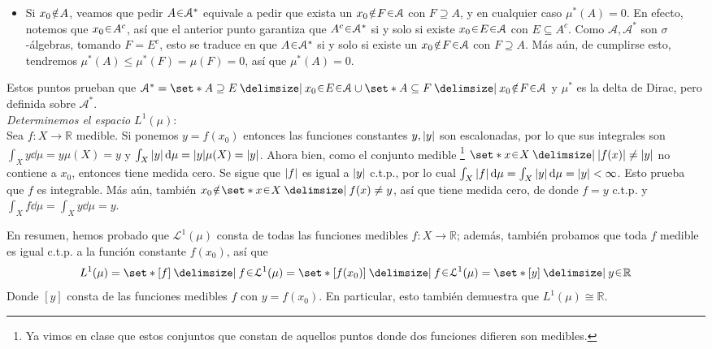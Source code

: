 \begin{sol}
\begin{itemize}
\item Si $x_0 \noten A$, veamos que pedir $A\en\mathcal{A}^*$ equivale a pedir que exista un $x_0 \noten F \en\mathcal{A}$ con $F \supseteq A$, y en cualquier caso $\mu^*(A) = 0$. 
En efecto, notemos que $x_0\en A^c$, así que el anterior punto garantiza que $A^c\en\mathcal{A}^*$ si y solo si existe $x_0 \en E \en\mathcal{A}$ con $E \subseteq A^c$. Como $\mathcal{A},\mathcal{A}^*$ son $\sigma$-álgebras, tomando $F = E^c$, esto se traduce en que $A\en\mathcal{A}^*$ si y solo si existe un $x_0 \noten F \en\mathcal{A}$ con $F \supseteq A$. Más aún, de cumplirse esto, tendremos $\mu^*(A) \leq \mu^*(F) = \mu(F) = 0$, así que $\mu^*(A) = 0$.
\end{itemize}
Estos puntos prueban que $\mathcal{A}^* = \set*{A \supseteq E \given x_0 \en E \en\mathcal{A}} \cup \set*{A \subseteq F \given x_0 \noten F \en\mathcal{A}}$ y $\mu^*$ es la delta de Dirac, pero definida sobre $\mathcal{A}^*$.\vspace{1em}\\
\emph{Determinemos el espacio $L^1(\mu)$}:\\
Sea $f \colon X \to\mathbb{R}$ medible. Si ponemos $y=f(x_0)$ entonces las funciones constantes $y,\abs{y}$ son escalonadas, por lo que sus integrales son $\int_X y \dd{\mu} = y\mu(X) = y$ y $\int_X\abs{y}\dd{\mu} = \abs{y}\mu(X) = \abs{y}$. Ahora bien, como el conjunto medible%
\footnote{
    Ya vimos en clase que estos conjuntos que constan de aquellos puntos donde dos funciones difieren son medibles.
} 
$\set*{x\en X \given \abs{f(x)} \neq \abs{y}}$ no contiene a $x_0$, entonces tiene medida cero. Se sigue que $\abs{f}$ es igual a $\abs{y}$ c.t.p., por lo cual $\int_X \abs{f} \dd{\mu} = \int_X \abs{y} \dd{\mu} = \abs{y} < \infty$. Esto prueba que $f$ es integrable. Más aún, también $x_0 \noten \set*{x\en X \given f(x) \neq y}$, así que tiene medida cero, de donde $f=y$ c.t.p. y $\int_X f \dd{\mu} = \int_X y \dd{\mu} = y$.\par
En resumen, hemos probado que $\mathcal{L}^1(\mu)$ consta de todas las funciones medibles $f \colon X \to \mathbb{R}$; además, también probamos que toda $f$ medible es igual c.t.p. a la función constante $f(x_0)$, así que 
\[
L^1(\mu) 
= \set*{ [f] \given f\en \mathcal{L}^1(\mu) }
= \set*{[f(x_0)] \given f\en \mathcal{L}^1(\mu) }
= \set*{[y] \given y \en \mathbb{R}}
\]
Donde $[y]$ consta de las funciones medibles $f$ con $y=f(x_0)$. En particular, esto también demuestra que $L^1(\mu) \cong \mathbb{R}$.
\end{sol} 